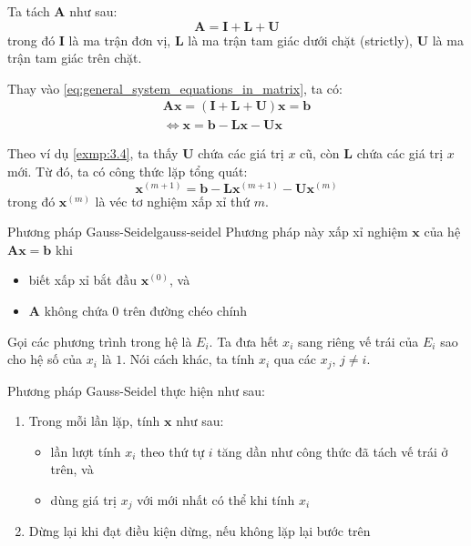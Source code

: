 \documentclass[../../Lectures]{subfiles}
\begin{document}
Ta tách \(\bm{A}\) như sau:
\[\bm{A} = \bm{I} + \bm{L} + \bm{U}\]
trong đó \(\bm{I}\) là ma trận đơn vị, \(\bm{L}\) là ma trận tam giác dưới chặt
(strictly), \(\bm{U}\) là ma trận tam giác trên chặt.

Thay vào \eqref{eq:general_system_equations_in_matrix}, ta có:
\begin{gather*}
    \bm{Ax} = (\bm{I} + \bm{L} + \bm{U}) \bm{x} = \bm{b} \\
    \iff \bm{x} = \bm{b} -\bm{Lx} - \bm{Ux}
\end{gather*}

Theo ví dụ \ref{exmp:3.4}, ta thấy \(\bm{U}\) chứa các giá trị \(x\) cũ, còn
\(\bm{L}\) chứa các giá trị \(x\) mới. Từ đó, ta có công thức lặp tổng quát:
\begin{equation}\label{eq:gauss-seldel_sequence_function}
    \bm{x}^{(m + 1)} = \bm{b} - \bm{L} \bm{x}^{(m + 1)} - \bm{U} \bm{x}^{(m)}
\end{equation}
trong đó \(\bm{x}^{(m)}\) là véc tơ nghiệm xấp xỉ thứ \(m\).

\begin{cmethod}{Phương pháp Gauss-Seidel}{gauss-seidel}
    Phương pháp này xấp xỉ nghiệm \(\bm{x}\) của hệ \(\bm{Ax} = \bm{b}\) khi
    \begin{itemize}
        \item biết xấp xỉ bắt đầu \(\bm{x}^{(0)}\), và
        \item \(\bm{A}\) không chứa \(0\) trên đường chéo chính
    \end{itemize}

    Gọi các phương trình trong hệ là \(E_i\). Ta đưa hết \(x_i\) sang riêng vế
    trái của \(E_i\) sao cho hệ số của \(x_i\) là \(1\). Nói cách khác, ta tính
    \(x_i\) qua các \(x_j\), \(j \neq i\).

    Phương pháp Gauss-Seidel thực hiện như sau:
    \begin{enumerate}
        \item Trong mỗi lần lặp, tính \(\bm{x}\) như sau:
            \begin{itemize}
                \item lần lượt tính \(x_i\) theo thứ tự \(i\) tăng dần như công
                    thức đã tách vế trái ở trên, và
                \item dùng giá trị \(x_j\) với mới nhất có thể khi tính \(x_i\)
            \end{itemize}
        \item Dừng lại khi đạt điều kiện dừng, nếu không lặp lại bước trên
    \end{enumerate}
\end{cmethod}
\end{document}
